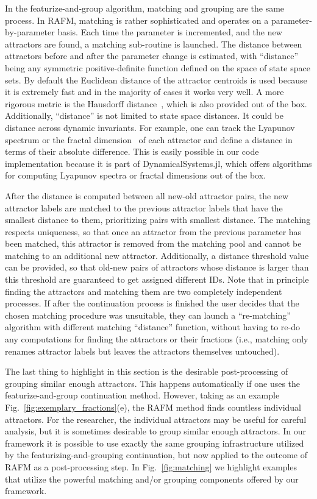 \documentclass[%
 aip,
 amsmath,amssymb,
 reprint,%
]{revtex4-1}
\begin{document}
In the featurize-and-group algorithm, matching and grouping are the same process. In RAFM, matching is rather sophisticated and operates on a parameter-by-parameter basis. Each time the parameter is incremented, and the new attractors are found, a matching sub-routine is launched. The distance between attractors before and after the parameter change is estimated, with ``distance'' being any symmetric positive-definite function defined on the space of state space sets. By default the Euclidean distance of the attractor centroids is used because it is extremely fast and in the majority of cases it works very well. A more rigorous metric is the Hausdorff distance~\cite{Hausdorff1949-nn}, which is also provided out of the box. Additionally, ``distance'' is not limited to state space distances. It could be distance across dynamic invariants. For example, one can track the Lyapunov spectrum or the fractal dimension~\cite{DatserisBook} of each attractor and define a distance in terms of their absolute difference. This is easily possible in our code implementation because it is part of DynamicalSystems.jl, which offers algorithms for computing Lyapunov spectra or fractal dimensions out of the box.

After the distance is computed between all new-old attractor pairs, the new attractor labels are matched to the previous attractor labels that have the smallest distance to them, prioritizing pairs with smallest distance. The matching respects uniqueness, so that once an attractor from the previous parameter has been matched, this attractor is removed from the matching pool and cannot be matching to an additional new attractor. Additionally, a distance threshold value can be provided, so that old-new pairs of attractors whose distance is larger than this threshold are guaranteed to get assigned different IDs. Note that in principle finding the attractors and matching them are two completely independent processes. If after the continuation process is finished the user decides that the chosen matching procedure was unsuitable, they can launch a ``re-matching'' algorithm with different matching ``distance'' function, without having to re-do any computations for finding the attractors or their fractions (i.e., matching only renames attractor labels but leaves the attractors themselves untouched).

The last thing to highlight in this section is the desirable post-processing of grouping similar enough attractors. This happens automatically if one uses the featurize-and-group continuation method. However, taking as an example Fig.~\ref{fig:exemplary_fractions}(e), the RAFM method finds countless individual attractors. For the researcher, the individual attractors may be useful for careful analysis, but it is sometimes desirable to group similar enough attractors. In our framework it is possible to use exactly the same grouping infrastructure utilized by the featurizing-and-grouping continuation, but now applied to the outcome of RAFM as a post-processing step. In Fig.~\ref{fig:matching} we highlight examples that utilize the powerful matching and/or grouping components offered by our framework.
\end{document}
